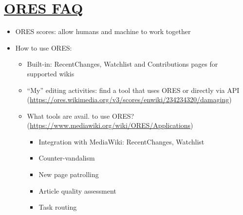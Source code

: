 \documentclass[12pt,a4paper]{article}
\begin{document}
\section{\href{https://www.mediawiki.org/wiki/ORES/FAQ}{ORES FAQ}}
\begin{itemize}
\item ORES scores: allow humans and machine to work together
\item How to use ORES: 
\begin{itemize}
\item Built-in: RecentChanges, Watchlist and Contributions pages for supported wikis
\item ``My'' editing activities: find a tool that uses ORES or directly via API (\url{https://ores.wikimedia.org/v3/scores/enwiki/234234320/damaging})
\item What tools are avail. to use ORES? (\url{https://www.mediawiki.org/wiki/ORES/Applications})
\begin{itemize}
\item Integration with MediaWiki: RecentChanges, Watchlist
\item Counter-vandalism
\item New page patrolling
\item Article quality assessment
\item Task routing
\end{itemize}
\end{itemize}
\end{itemize}
\end{document}
